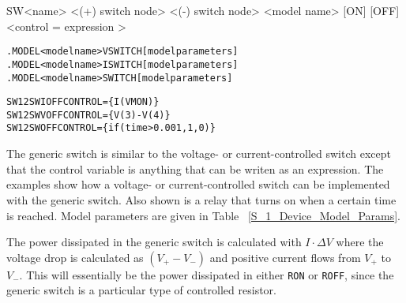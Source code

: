 


\begin{Device}

\device
SW<name> <(+) switch node> <(-) switch node> <model name> [ON] [OFF] <control = { expression }>

\model
\begin{alltt}
.MODEL <model name> VSWITCH [model parameters]
.MODEL <model name> ISWITCH [model parameters]
.MODEL <model name> SWITCH [model parameters]
\end{alltt}

\examples
\begin{alltt}
SW 1 2 SWI OFF CONTROL=\{I(VMON)\}
SW 1 2 SWV OFF CONTROL=\{V(3)-V(4)\}
SW 1 2 SW OFF CONTROL=\{if(time>0.001,1,0)\}
\end{alltt}

\comments

The generic switch is similar to the voltage- or current-controlled
switch except that the control variable is anything that can be writen
as an expression.  The examples show how a voltage- or
current-controlled switch can be implemented with the generic switch.
Also shown is a relay that turns on when a certain time is reached.
Model parameters are given in Table ~\ref{S_1_Device_Model_Params}.

The power dissipated in the generic switch is calculated with $I \cdot \Delta V$ 
where the voltage drop is calculated as $(V_+ - V_-)$ and positive current 
flows from $V_+$ to $V_-$.  This will essentially be the power dissipated
in either \texttt{RON} or \texttt{ROFF}, since the generic switch is a particular 
type of controlled resistor.

\end{Device}
